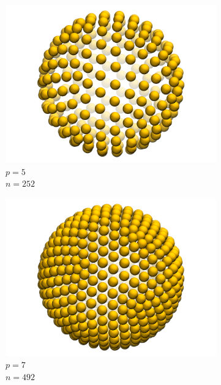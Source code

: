 \documentclass[10pt,a4paper]{report}
\begin{document}
\begin{figure}[!h]
\begin{subfigure}[t]{0.18\textwidth}
    \includegraphics[width=\textwidth]{figures/grid_252.png} 
    \footnotesize
    $p = 5$ \\
    $n = 252$
  \end{subfigure}
  \begin{subfigure}[t]{0.18\textwidth}
    \center
    \includegraphics[width=\textwidth]{figures/grid_492.png} 
    \footnotesize
    $p = 7$ \\
    $n = 492$
  \end{subfigure}
  \begin{subfigure}[t]{0.18\textwidth}
    \center

\end{subfigure}
\end{figure}
\end{document}
